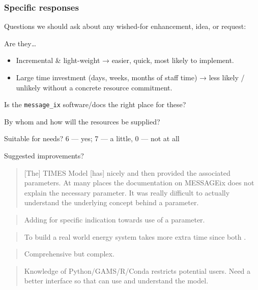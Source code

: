 \documentclass[12pt,aspectratio=169]{beamer}
\begin{document}
\begin{frame}[allowframebreaks]
\frametitle{Specific responses}

Questions we should ask about any wished-for enhancement, idea, or request:

\bigskip
Are they…
\begin{itemize}
  \item Incremental \& light-weight → easier, quick, most likely to implement.
  \item Large time investment (days, weeks, months of staff time) → less likely / unlikely without a concrete resource commitment.
\end{itemize}

\bigskip
Is the \texttt{message\_ix} software/docs the right place for these?

\bigskip
By whom and how will the resources be supplied?

\framebreak


\medskip
Suitable for needs?
6 — yes; 7 — a little, 0 — not at all

\medskip
Suggested improvements?

\begin{quote}
  [The] TIMES Model [has] nicely  and then provided the associated parameters. At many places the documentation on MESSAGEix does not explain the necessary parameter. It was really difficult to actually understand the underlying concept behind a parameter.
\end{quote}

\begin{quote}
  Adding  for specific indication towards use of a parameter.
\end{quote}

\framebreak


\begin{quote}
  To build a real world energy system takes more extra time since both .
\end{quote}

\begin{quote}
  Comprehensive but complex.
\end{quote}

\begin{quote}
  Knowledge of Python/GAMS/R/Conda restricts potential users. Need a better interface so that  can use and understand the model.
\end{quote}


\end{frame}
\end{document}

